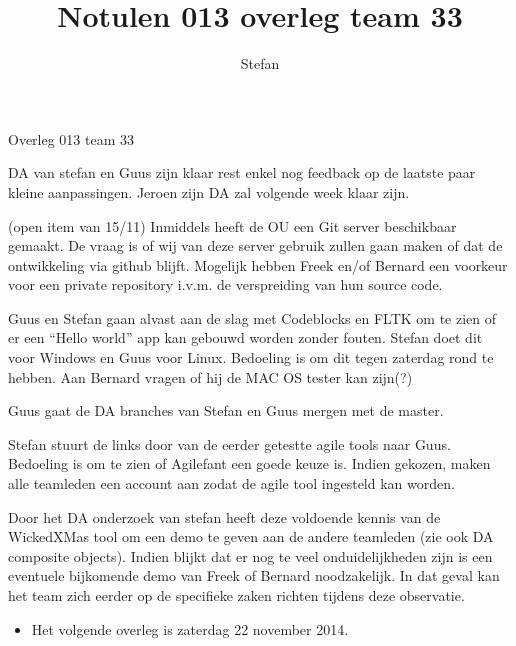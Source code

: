 \documentclass{article}
\title{Notulen 013 overleg team 33}
\author{Stefan}
\begin{document}

\begin{Minutes}{Overleg 013 team 33}

\maketitle%


DA van stefan en Guus zijn klaar rest enkel nog feedback op de laatste paar kleine aanpassingen.
Jeroen zijn DA zal volgende week klaar zijn.

(open item van 15/11)
Inmiddels heeft de OU een Git server beschikbaar gemaakt. De vraag is of wij van
deze server gebruik zullen gaan maken of dat de ontwikkeling via github blijft.
Mogelijk hebben Freek en/of Bernard een voorkeur voor een private repository i.v.m.
de verspreiding van hun source code.

Guus en Stefan gaan alvast aan de slag met Codeblocks en FLTK om te zien of er een
``Hello world'' app kan gebouwd worden zonder fouten.
Stefan doet dit voor Windows en Guus voor Linux.
Bedoeling is om dit tegen zaterdag rond te hebben.
Aan Bernard vragen of hij de MAC OS tester kan zijn(?)

Guus gaat de DA branches van Stefan en Guus mergen met de master.

Stefan stuurt de links door van de eerder getestte agile tools naar Guus. Bedoeling is om te zien
of Agilefant een goede keuze is. Indien gekozen, maken alle teamleden een account aan
zodat de agile tool ingesteld kan worden.



Door het DA onderzoek van stefan heeft deze voldoende kennis van de WickedXMas tool 
om een demo te geven aan de andere teamleden (zie ook DA composite objects).
Indien blijkt dat er nog te veel onduidelijkheden zijn is een eventuele bijkomende demo
van Freek of Bernard noodzakelijk. In dat geval kan het team zich eerder op
de specifieke zaken richten tijdens deze observatie.



\begin{itemize}
 \item Het volgende overleg is zaterdag 22 november 2014. 
\end{itemize}


\end{Minutes}
\end{document}
